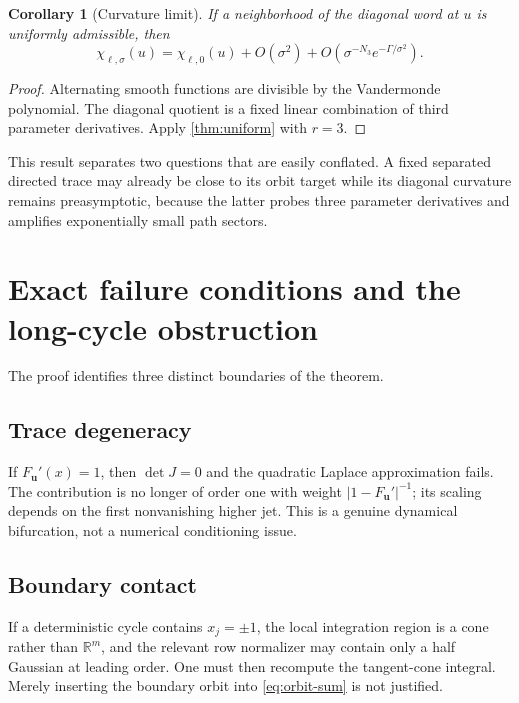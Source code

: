 \documentclass[11pt]{article}
\newtheorem{corollary}[theorem]{Corollary}
\theoremstyle{remark}
\newcommand{\R}{\mathbb R}
\newcommand{\bu}{\boldsymbol u}
\begin{document}
\begin{corollary}[Curvature limit]
\label{cor:curvature}
If a neighborhood of the diagonal word at $u$ is uniformly admissible, then
\begin{equation}
 \chi_{\ell,\sigma}(u)=\chi_{\ell,0}(u)+O(\sigma^2)
 +O\left(\sigma^{-N_3}e^{-\Gamma/\sigma^2}\right).
 \label{eq:curvature-limit}
\end{equation}
\end{corollary}

\begin{proof}
Alternating smooth functions are divisible by the Vandermonde polynomial.
The diagonal quotient is a fixed linear combination of third parameter
derivatives.  Apply \cref{thm:uniform} with $r=3$.
\end{proof}

This result separates two questions that are easily conflated.  A fixed
separated directed trace may already be close to its orbit target while its
diagonal curvature remains preasymptotic, because the latter probes three
parameter derivatives and amplifies exponentially small path sectors.

\section{Exact failure conditions and the long-cycle obstruction}
\label{sec:obstructions}

The proof identifies three distinct boundaries of the theorem.

\subsection{Trace degeneracy}

If $F_{\bu}'(x)=1$, then $\det J=0$ and the quadratic Laplace approximation
fails.  The contribution is no longer of order one with weight
$|1-F_{\bu}'|^{-1}$; its scaling depends on the first nonvanishing higher jet.
This is a genuine dynamical bifurcation, not a numerical conditioning issue.

\subsection{Boundary contact}

If a deterministic cycle contains $x_j=\pm1$, the local integration region is
a cone rather than $\R^m$, and the relevant row normalizer may contain only a
half Gaussian at leading order.  One must then recompute the tangent-cone
integral.  Merely inserting the boundary orbit into \eqref{eq:orbit-sum} is not
justified.
\end{document}
